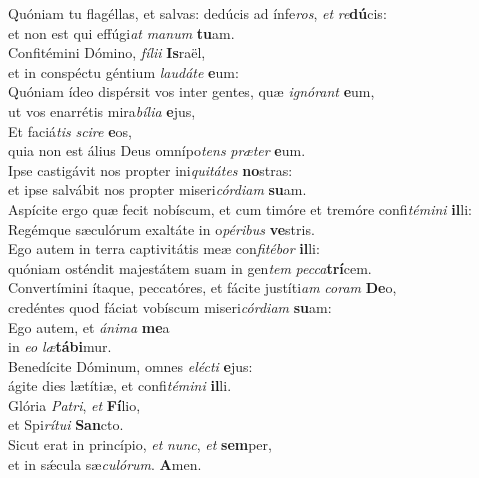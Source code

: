 \evenverse Quóniam tu flagéllas, et salvas: dedúcis ad ínfe\textit{ros}, \textit{et} \textit{re}\textbf{dú}cis:~\*\\
\evenverse et non est qui effúgi\textit{at} \textit{ma}\textit{num} \textbf{tu}am.\\
\oddverse Confitémini Dómino, \textit{fí}\textit{li}\textit{i} \textbf{Is}raël,~\*\\
\oddverse et in conspéctu géntium \textit{lau}\textit{dá}\textit{te} \textbf{e}um:\\
\evenverse Quóniam ídeo dispérsit vos inter gentes, quæ \textit{i}\textit{gnó}\textit{rant} \textbf{e}um,~\*\\
\evenverse ut vos enarrétis mira\textit{bí}\textit{li}\textit{a} \textbf{e}jus,\\
\oddverse Et faciá\textit{tis} \textit{sci}\textit{re} \textbf{e}os,~\*\\
\oddverse quia non est álius Deus omnípo\textit{tens} \textit{præ}\textit{ter} \textbf{e}um.\\
\evenverse Ipse castigávit nos propter ini\textit{qui}\textit{tá}\textit{tes} \textbf{no}stras:~\*\\
\evenverse et ipse salvábit nos propter miseri\textit{cór}\textit{di}\textit{am} \textbf{su}am.\\
\oddverse Aspícite ergo quæ fecit nobíscum, et cum timóre et tremóre confi\textit{té}\textit{mi}\textit{ni} \textbf{il}li:~\*\\
\oddverse Regémque sæculórum exaltáte in o\textit{pé}\textit{ri}\textit{bus} \textbf{ve}stris.\\
\evenverse Ego autem in terra captivitátis meæ con\textit{fi}\textit{té}\textit{bor} \textbf{il}li:~\*\\
\evenverse quóniam osténdit majestátem suam in gen\textit{tem} \textit{pec}\textit{ca}\textbf{trí}cem.\\
\oddverse Convertímini ítaque, peccatóres, et fácite justíti\textit{am} \textit{co}\textit{ram} \textbf{De}o,~\*\\
\oddverse credéntes quod fáciat vobíscum miseri\textit{cór}\textit{di}\textit{am} \textbf{su}am:\\
\evenverse Ego autem, et \textit{á}\textit{ni}\textit{ma} \textbf{me}a~\*\\
\evenverse in \textit{e}\textit{o} \textit{læ}\textbf{tá}\textbf{bi}mur.\\
\oddverse Benedícite Dóminum, omnes \textit{e}\textit{lé}\textit{cti} \textbf{e}jus:~\*\\
\oddverse ágite dies lætítiæ, et confi\textit{té}\textit{mi}\textit{ni} \textbf{il}li.\\
\evenverse Glória \textit{Pa}\textit{tri}, \textit{et} \textbf{Fí}lio,~\*\\
\evenverse et Spi\textit{rí}\textit{tu}\textit{i} \textbf{San}cto.\\
\oddverse Sicut erat in princípio, \textit{et} \textit{nunc}, \textit{et} \textbf{sem}per,~\*\\
\oddverse et in sǽcula sæ\textit{cu}\textit{ló}\textit{rum}. \textbf{A}men.\\
